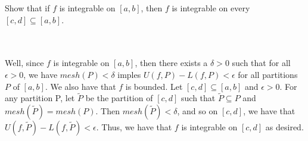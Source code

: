 Show that if $f$ is integrable on $[a,b]$, then $f$ is integrable on every $[c,d]\subseteq[a,b]$.\\\\

\begin{solution}\renewcommand{\qedsymbol}{}\ \\
    Well, since $f$ is integrable on $[a,b]$, then there exists a $\delta>0$ such that for all
    $\epsilon>0$, we have $mesh(P)<\delta$ imples $U(f,P)-L(f,P)<\epsilon$ for all partitions $P$ of
    $[a,b]$. We also have that $f$ is bounded. Let $[c,d]\subseteq[a,b]$ and $\epsilon>0$. For any
    partition P, let $\tilde{P}$ be the partition of $[c,d]$ such that $\tilde{P}\subseteq P$ and
    $mesh(\tilde{P})=mesh(P)$. Then $mesh(\tilde{P})<\delta$, and so on $[c,d]$, we have that
    $U(f,\tilde{P})-L(f,\tilde{P})<\epsilon$. Thus, we have that $f$ is integrable on $[c,d]$ as
    desired.

\end{solution}